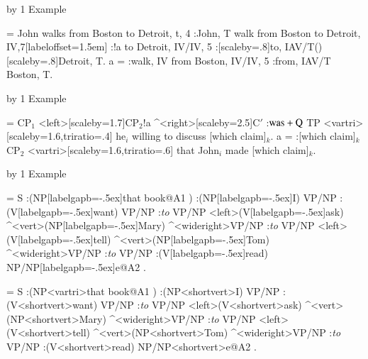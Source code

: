 \documentclass[12pt]{article}
\begin{document}
\fi

\newcount\Exno
\def\example{\advance\Exno by 1
   Example \the\Exno\par\nobreak\bigskip}
\def\exdisplay{\bigskip\par\begingroup}
\def\xe{\endgroup\bigskip\par}

\parindent=0pt

\example

\exdisplay
\hfil
\jtree[xunit=4em,yunit=4.4ex,everylabel=\it]
\! = {John walks from Boston to Detroit\rm, t, 4}
   :{John\rm, T} {walk from Boston
                     to Detroit\rm, IV,7}[labeloffset=1.5em]
   :!a
      {to Detroit\rm, IV/IV, 5}
   :[scaleby=.8]{to\rm, IAV/T}() [scaleby=.8]{Detroit\rm, T}.
\!a = :{walk\rm, IV} {from Boston\rm, IV/IV, 5}
   :{from\rm, IAV/T} {Boston\rm, T}.
\endjtree
\xe


\example

\exdisplay
\jtree[xunit=3em,yunit=1.4em]
%
\! = {CP$_1$}
   <left>[scaleby=1.7]{CP$_2$}!a ^<right>[scaleby=2.5]{C$'$}
   :{$\rm was+Q$} {TP}
   <vartri>[scaleby=1.6,triratio=.4]
      {he$_i$ willing to discuss \what}.
\!a = :{\what} {CP$_2$}
   <vartri>[scaleby=1.6,triratio=.6]
      {that John$_i$ made \what}.
\endjtree
\xe


\example

\jtree[xunit=2.2em,yunit=1.5ex,bbadjust=depth 2ex]
\def\\{[labelgapb=-.5ex]}%
\! = {S}
   :({NP}\\{that book}@A1 ) 
   :({NP}\\{I}) {VP/NP}
   :({V}\\{want}) {VP/NP}
   :{\it to} {VP/NP}
   <left>({V}\\{ask}) ^<vert>({NP}\\{Mary}) ^<wideright>{VP/NP}
   :{\it to} {VP/NP}
   <left>({V}\\{tell}) ^<vert>({NP}\\{Tom}) ^<wideright>{VP/NP}
   :{\it to} {VP/NP}
   :({V}\\{read}) {NP/NP}\\{e}@A2 .
\endjtree

\exdisplay
\jtree[xunit=2.2em,yunit=1.5ex,bbadjust=depth 2ex]
\def\\{<shortvert>}%
\! = {S}
   :({NP}<vartri>{that book}@A1 ) 
   :({NP}\\{I}) {VP/NP}
   :({V}\\{want}) {VP/NP}
   :{\it to} {VP/NP}
   <left>({V}\\{ask}) ^<vert>({NP}\\{Mary}) ^<wideright>{VP/NP}
   :{\it to} {VP/NP}
   <left>({V}\\{tell}) ^<vert>({NP}\\{Tom}) ^<wideright>{VP/NP}
   :{\it to} {VP/NP}
   :({V}\\{read}) {NP/NP}\\{e}@A2 .
\endjtree
\xe
\end{document}

